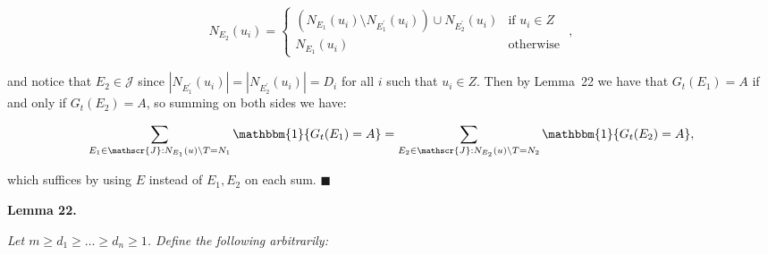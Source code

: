 \documentclass[10pt,a4paper]{article}
\begin{document}
\[\begin{gathered}
\displaystyle N_{E_{2}}(u_{i})=\begin{cases}\left(N_{E_{1}}(u_{i})\setminus N_{E^{\prime}_{1}}(u_{i})\right)\cup N_{E^{\prime}_{2}}(u_{i})&\text{if }u_{i}\in Z\\
N_{E_{1}}(u_{i})&\text{otherwise }\end{cases},
\end{gathered}\]


and notice that $E_{2}\in\mathscr{J}$ since $|N_{E^{\prime}_{1}}(u_{i})|=|N_{E^{\prime}_{2}}(u_{i})|=D_{i}$ for all $i$ such that $u_{i}\in Z$.
Then by Lemma 22 we have that $G_{t}(E_{1})=A$ if and only if $G_{t}(E_{2})=A$, so summing on both sides we have:\par


\[\begin{gathered}
\displaystyle\sum_{E_{1}\in\mathscr{J}:N_{E_{1}}(u)\setminus T=N_{1}}\mathbbm{1}\{G_{t}(E_{1})=A\}=\sum_{E_{2}\in\mathscr{J}:N_{E_{2}}(u)\setminus T=N_{2}}\mathbbm{1}\{G_{t}(E_{2})=A\},
\end{gathered}\]


which suffices by using $E$ instead of $E_{1},E_{2}$ on each sum.
\ensuremath{\blacksquare}\par






\par\medskip\noindent\textbf{\textbf{Lemma 22}\textbf{.}}\par



\emph{Let $m\geq d_{1}\geq\dots\geq d_{n}\geq 1$. Define the following arbitrarily:}\par
\end{document}
